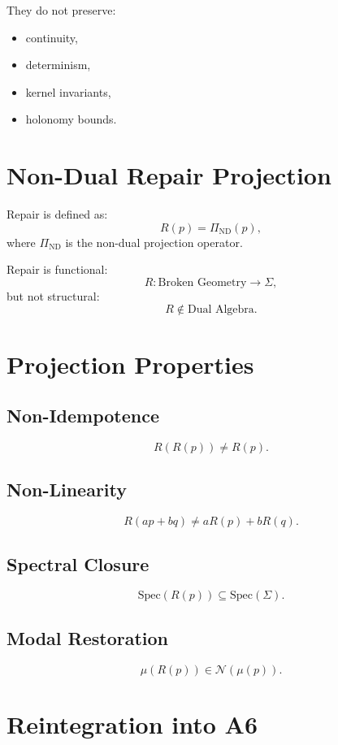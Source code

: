 \documentclass[11pt]{article}
\begin{document}
They do not preserve:
\begin{itemize}
  \item continuity,
  \item determinism,
  \item kernel invariants,
  \item holonomy bounds.
\end{itemize}

\section{Non-Dual Repair Projection}

Repair is defined as:
\[
R(p) = \Pi_{\mathrm{ND}}(p),
\]
where $\Pi_{\mathrm{ND}}$ is the non-dual projection operator.

Repair is functional:
\[
R : \text{Broken Geometry} \to \Sigma,
\]
but not structural:
\[
R \notin \text{Dual Algebra}.
\]

\section{Projection Properties}

\subsection{Non-Idempotence}
\[
R(R(p)) \ne R(p).
\]

\subsection{Non-Linearity}
\[
R(a p + b q) \ne a R(p) + b R(q).
\]

\subsection{Spectral Closure}
\[
\mathrm{Spec}(R(p)) \subseteq \mathrm{Spec}(\Sigma).
\]

\subsection{Modal Restoration}
\[
\mu(R(p)) \in \mathcal{N}(\mu(p)).
\]

\section{Reintegration into A6}
\end{document}
